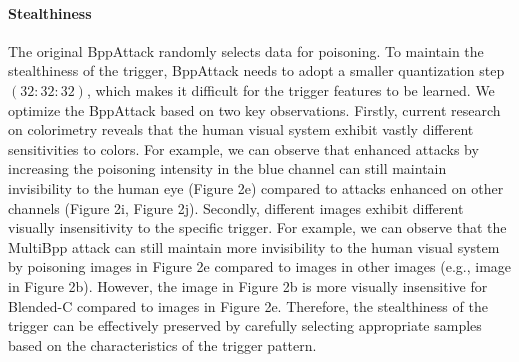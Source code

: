 \documentclass{article}
\begin{document}
\paragraph{Stealthiness}
The original BppAttack randomly selects data for poisoning. To maintain the stealthiness of the trigger, BppAttack needs to adopt a smaller quantization step \((32:32:32)\), which makes it difficult for the trigger features to be learned. We optimize the BppAttack based on two key observations. Firstly, current research on colorimetry reveals that the human visual system exhibit vastly different sensitivities to colors. For example, we can observe that enhanced attacks by increasing the poisoning intensity in the blue channel can still maintain invisibility to the human eye (Figure 2e) compared to attacks enhanced on other channels (Figure 2i, Figure 2j). Secondly, different images exhibit different visually insensitivity to the specific trigger. For example, we can observe that the MultiBpp attack can still maintain more invisibility to the human visual system by poisoning images in Figure 2e compared to images in other images (e.g., image in Figure 2b). However, the image in Figure 2b is more visually insensitive for Blended-C compared to images in Figure 2e. Therefore, the stealthiness of the trigger can be effectively preserved by carefully selecting appropriate samples based on the characteristics of the trigger pattern.
\end{document}
